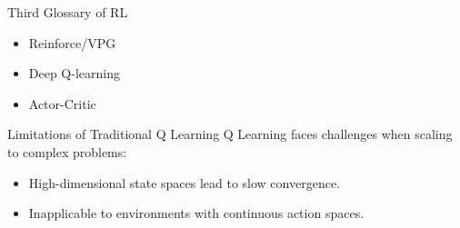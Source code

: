 \documentclass{beamer}
\begin{document}
\begin{frame}{Third Glossary of RL}
    \begin{itemize}
        \item Reinforce/VPG
        \item Deep Q-learning
        \item Actor-Critic
    \end{itemize}
\end{frame}


\begin{frame}{Limitations of Traditional Q Learning}
Q Learning faces challenges when scaling to complex problems:
\begin{itemize}
    \item High-dimensional state spaces lead to slow convergence.
    \item Inapplicable to environments with continuous action spaces.
\end{itemize}
\end{frame}
\end{document}
